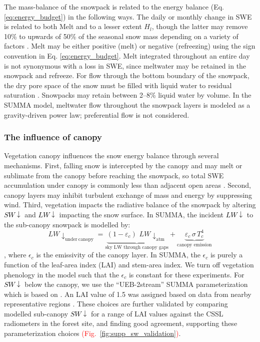 \documentclass[draft]{agujournal2019}
\newcommand{\fig}[2]{\textcolor{red}{(Fig.~\ref{#1}{#2})}}   %
\newcommand{\lwdn}{\textcolor{black}{$LW\downarrow$}\xspace}
\newcommand{\swdn}{\textcolor{black}{$SW\downarrow$}\xspace}
\begin{document}
The mass-balance of the snowpack is related to the energy balance (Eq. \ref{eq:energy_budget}) in the following ways.
The daily or monthly change in SWE is related to both Melt and to a lesser extent $H_l$, though the latter may remove 10\% to upwards of 50\% of the seasonal snow mass depending on a variety of factors \cite{Sexstone2018-rc, Schwat2025-ur}.
Melt may be either positive (melt) or negative (refreezing) using the sign convention in Eq. \ref{eq:energy_budget}.
Melt integrated throughout an entire day is not synonymous with a loss in SWE, since meltwater may be retained in the snowpack and refreeze.
For flow through the bottom boundary of the snowpack, the dry pore space of the snow must be filled with liquid water to residual saturation \cite{Colbeck1976-xk, Seligman2014-kc}. Snowpacks may retain between 2--8\% liquid water by volume.
In the SUMMA model, meltwater flow throughout the snowpack layers is modeled as a gravity-driven power law; preferential flow is not considered.




\subsubsection{The influence of canopy}\label{sec:canopy_influence}

Vegetation canopy influences the snow energy balance through several mechanisms.
First, falling snow is intercepted by the canopy and may melt or sublimate from the canopy before reaching the snowpack, so total SWE accumulation under canopy is commonly less than adjacent open areas \cite{Musselman2008-ws}.
Second, canopy layers may inhibit turbulent exchange of mass and energy by suppressing wind.
Third, vegetation impacts the radiative balance of the snowpack by altering \swdn and \lwdn impacting the snow surface.
In SUMMA, the incident \lwdn to the sub-canopy snowpack is modelled by:
\begin{equation}\label{eq:canopy_lw}
LW\downarrow_{\mathrm{under\ canopy}} = \underbrace{(1 - \varepsilon_c)\,\,LW\downarrow_{\text{atm}}}_{\text{sky LW through canopy gaps}}
+ \underbrace{\varepsilon_c\,\sigma\,T_c^4}_{\text{canopy emission}}
\end{equation},
where $\epsilon_c$ is the emissivity of the canopy layer.
In SUMMA, the $\epsilon_c$ is purely a function of the leaf-area index (LAI) and stem-area index.
We turn off vegetation phenology in the model such that the $\epsilon_c$ is constant for these experiments.
For \swdn below the canopy, we use the ``UEB-2stream'' SUMMA parameterization which is based on .
An LAI value of 1.5 was assigned based on data from nearby representative regions \cite{Krogh2020-dh}.
These choices are further validated by comparing modelled sub-canopy \swdn for a range of LAI values against the CSSL radiometers in the forest site, and finding good agreement, supporting these parameterization choices \fig{fig:supp_sw_validation}{}.
\end{document}
